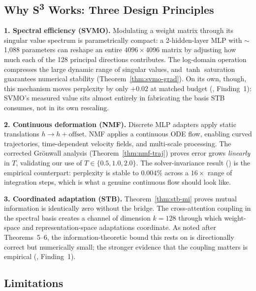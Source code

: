 \documentclass[conference]{IEEEtran}
\newcommand{\svmo}{\textsc{SVMO}}
\newcommand{\nmf}{\textsc{NMF}}
\newcommand{\stb}{\textsc{STB}}
\newcommand{\sthree}{S\textsuperscript{3}}
\begin{document}
\subsection{Why \sthree{} Works: Three Design Principles}

\textbf{1. Spectral efficiency (\svmo).} Modulating a weight matrix through its singular value spectrum is parametrically compact: a 2-hidden-layer MLP with $\sim$1{,}088 parameters can reshape an entire $4096 \times 4096$ matrix by adjusting how much each of the 128 principal directions contributes. The log-domain operation compresses the large dynamic range of singular values, and $\tanh$ saturation guarantees numerical stability (Theorem~\ref{thm:svmo-grad}). On its own, though, this mechanism moves perplexity by only $+0.02$ at matched budget (, Finding~1): SVMO's measured value sits almost entirely in fabricating the basis STB consumes, not in its own rescaling.

\textbf{2. Continuous deformation (\nmf).} Discrete MLP adapters apply static translations $h \to h + \text{offset}$. NMF applies a continuous ODE flow, enabling curved trajectories, time-dependent velocity fields, and multi-scale processing. The corrected Gr\"onwall analysis (Theorem~\ref{thm:nmf-traj}) proves error grows \textit{linearly} in $T$, validating our use of $T \in \{0.5, 1.0, 2.0\}$. The solver-invariance result () is the empirical counterpart: perplexity is stable to $0.004\%$ across a $16\times$ range of integration steps, which is what a genuine continuous flow should look like.

\textbf{3. Coordinated adaptation (\stb).} Theorem~\ref{thm:stb-mi} proves mutual information is identically zero without the bridge. The cross-attention coupling in the spectral basis creates a channel of dimension $k=128$ through which weight-space and representation-space adaptations coordinate. As noted after Theorems~5--6, the information-theoretic bound this rests on is directionally correct but numerically small; the stronger evidence that the coupling matters is empirical (, Finding~1).

\subsection{Limitations}
\end{document}
